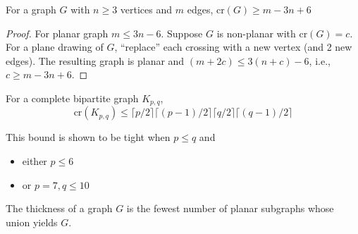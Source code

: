 \begin{lemma}
For a graph $G$ with $n\ge3$ vertices and $m$ edges, $\text{cr}(G)\ge m-3n+6$
\end{lemma}
\begin{proof}
For planar graph $m\le 3n-6$. Suppose $G$ is non-planar with $\text{cr}(G)=c$.
For a plane drawing of $G$, ``replace'' each crossing with a new vertex (and 2 new edges). The resulting graph is planar and $(m+2c)\le 3(n+c)-6$, i.e., $c\ge m-3n+6$.
\end{proof}
\begin{lemma}
For a complete bipartite graph $K_{p,q}$,
\[
\text{cr}(K_{p,q})\le\lceil p/2
\rceil
\lceil (p-1)/2
\rceil
\lceil q/2
\rceil
\lceil (q-1)/2
\rceil
\]
\end{lemma}
\begin{remark}
This bound is shown to be tight when $p\le q$ and 
\begin{itemize}
\item
either $p\le 6$
\item
or $p=7,q\le10$
\end{itemize}
\end{remark}


\begin{definition}[Thickness]
The thickness of a graph $G$ is the fewest number of planar subgraphs whose union yields $G$.
\end{definition}



















